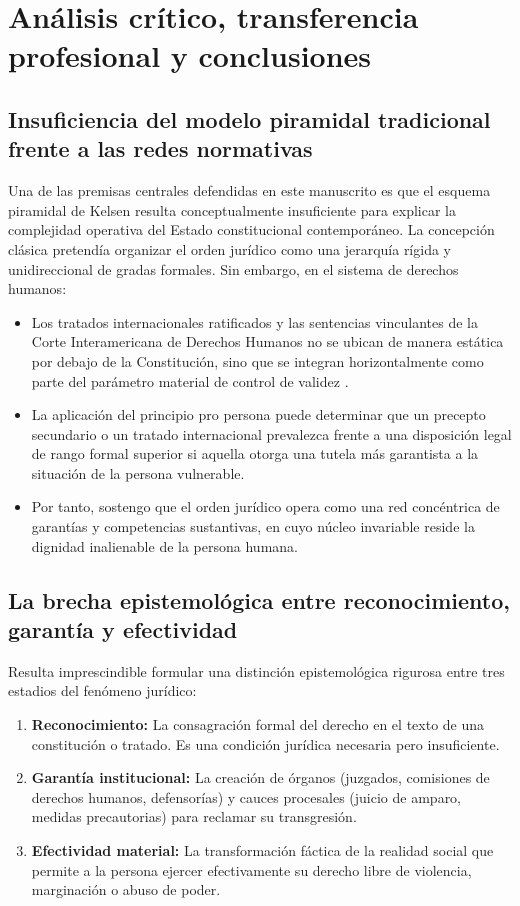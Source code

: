 \documentclass[12pt,spanish,letterpaper,oneside]{article}
\begin{document}
\clearpage
\section{An\'alisis cr\'itico, transferencia profesional y conclusiones}

\subsection{Insuficiencia del modelo piramidal tradicional frente a las redes normativas}

Una de las premisas centrales defendidas en este manuscrito es que el esquema piramidal de Kelsen resulta conceptualmente insuficiente para explicar la complejidad operativa del Estado constitucional contempor\'aneo. La concepci\'on cl\'asica pretend\'ia organizar el orden jur\'idico como una jerarqu\'ia r\'igida y unidireccional de gradas formales. Sin embargo, en el sistema de derechos humanos:
\begin{itemize}
\item Los tratados internacionales ratificados y las sentencias vinculantes de la Corte Interamericana de Derechos Humanos no se ubican de manera est\'atica por debajo de la Constituci\'on, sino que se integran horizontalmente como parte del par\'ametro material de control de validez \citep{scjnParametro2014ADH}.
\item La aplicaci\'on del principio pro persona puede determinar que un precepto secundario o un tratado internacional prevalezca frente a una disposici\'on legal de rango formal superior si aquella otorga una tutela m\'as garantista a la situaci\'on de la persona vulnerable.
\item Por tanto, sostengo que el orden jur\'idico opera como una red conc\'entrica de garant\'ias y competencias sustantivas, en cuyo n\'ucleo invariable reside la dignidad inalienable de la persona humana.
\end{itemize}

\subsection{La brecha epistemol\'ogica entre reconocimiento, garant\'ia y efectividad}

Resulta imprescindible formular una distinci\'on epistemol\'ogica rigurosa entre tres estadios del fen\'omeno jur\'idico:
\begin{enumerate}
\item \textbf{Reconocimiento:} La consagraci\'on formal del derecho en el texto de una constituci\'on o tratado. Es una condici\'on jur\'idica necesaria pero insuficiente.
\item \textbf{Garant\'ia institucional:} La creaci\'on de \'organos (juzgados, comisiones de derechos humanos, defensor\'ias) y cauces procesales (juicio de amparo, medidas precautorias) para reclamar su transgresi\'on.
\item \textbf{Efectividad material:} La transformaci\'on f\'actica de la realidad social que permite a la persona ejercer efectivamente su derecho libre de violencia, marginaci\'on o abuso de poder.
\end{enumerate}
\end{document}
